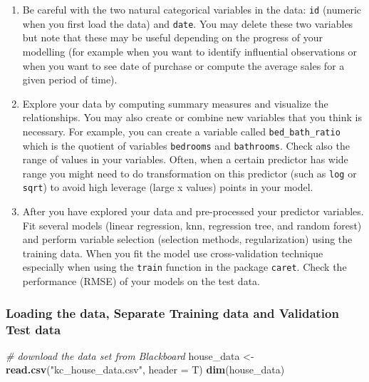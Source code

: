 \documentclass[]{article}
\newenvironment{Shaded}{\begin{snugshade}}{\end{snugshade}}
\newcommand{\KeywordTok}[1]{\textcolor[rgb]{0.13,0.29,0.53}{\textbf{#1}}}
\newcommand{\DataTypeTok}[1]{\textcolor[rgb]{0.13,0.29,0.53}{#1}}
\newcommand{\StringTok}[1]{\textcolor[rgb]{0.31,0.60,0.02}{#1}}
\newcommand{\CommentTok}[1]{\textcolor[rgb]{0.56,0.35,0.01}{\textit{#1}}}
\newcommand{\NormalTok}[1]{#1}
\begin{document}
\begin{enumerate}
\def\labelenumi{\alph{enumi})}
\setcounter{enumi}{1}
\item
  Be careful with the two natural categorical variables in the data:
  \texttt{id} (numeric when you first load the data) and \texttt{date}.
  You may delete these two variables but note that these may be useful
  depending on the progress of your modelling (for example when you want
  to identify influential observations or when you want to see date of
  purchase or compute the average sales for a given period of time).
\item
  Explore your data by computing summary measures and visualize the
  relationships. You may also create or combine new variables that you
  think is necessary. For example, you can create a variable called
  \texttt{bed\_bath\_ratio} which is the quotient of variables
  \texttt{bedrooms} and \texttt{bathrooms}. Check also the range of
  values in your variables. Often, when a certain predictor has wide
  range you might need to do transformation on this predictor (such as
  \texttt{log} or \texttt{sqrt}) to avoid high leverage (large x values)
  points in your model.
\item
  After you have explored your data and pre-processed your predictor
  variables. Fit several models (linear regression, knn, regression
  tree, and random forest) and perform variable selection (selection
  methods, regularization) using the training data. When you fit the
  model use cross-validation technique especially when using the
  \texttt{train} function in the package \texttt{caret}. Check the
  performance (RMSE) of your models on the test data.
\end{enumerate}

\subsubsection{Loading the data, Separate Training data and Validation
Test
data}\label{loading-the-data-separate-training-data-and-validation-test-data}

\begin{Shaded}
\begin{Highlighting}[]
\CommentTok{# download the data set from Blackboard}
\NormalTok{house_data <-}\StringTok{ }\KeywordTok{read.csv}\NormalTok{(}\StringTok{"kc_house_data.csv"}\NormalTok{, }\DataTypeTok{header =}\NormalTok{ T)}
\KeywordTok{dim}\NormalTok{(house_data)}
\end{Highlighting}
\end{Shaded}
\end{document}
